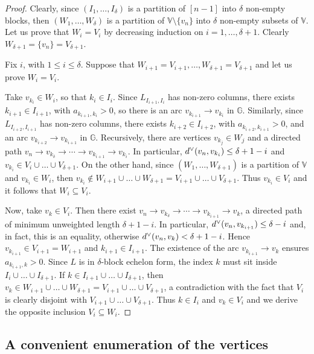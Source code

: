 \documentclass[10pt]{amsart}
\newcommand{\mbg}{\mbox{$\mathbb{G}$}}
\newcommand{\mbv}{\mbox{$\mathbb{V}$}}
\newcommand{\ud}{\mbox{${\rm d}^\vee$}}
\theoremstyle{definition}
\theoremstyle{remark}
\begin{document}
\begin{proof}
Clearly, since $(I_1,\ldots, I_\delta)$ is a partition of $[n-1]$ into
$\delta$ non-empty blocks, then $(W_1,\ldots ,W_{\delta})$ is a
partition of $\mbv\setminus\{v_n\}$ into $\delta$ non-empty subsets of
$\mbv$. Let us prove that $W_i=V_i$ by decreasing induction on
$i=1,\ldots ,\delta+1$. Clearly $W_{\delta+1}=\{v_n\}=V_{\delta+1}$.

Fix $i$, with $1\leq i\leq\delta$. Suppose that
$W_{i+1}=V_{i+1},\ldots ,W_{\delta+1}=V_{\delta+1}$ and let us prove
$W_i=V_i$.

Take $v_{k_i}\in W_i$, so that $k_i\in I_i$.  Since
$L_{I_{i+1},I_{i}}$ has non-zero columns, there exists $k_{i+1}\in
I_{i+1}$, with $a_{k_{i+1},k_i}>0$, so there is an arc $v_{k_{i+1}}\to
v_{k_i}$ in $\mbg$. Similarly, since $L_{I_{i+2},I_{i+1}}$ has
non-zero columns, there exists $k_{i+2}\in I_{i+2}$, with
$a_{k_{i+2},k_{i+1}}>0$, and an arc $v_{k_{i+2}}\to v_{k_{i+1}}$ in
$\mbg$. Recursively, there are vertices $v_{k_j}\in W_{j}$ and a
directed path $v_n\to v_{k_{\delta}}\to\cdots \to v_{k_{i+1}}\to
v_{k_i}$. In particular, $\ud(v_n,v_{k_i})\leq \delta+1-i$ and
$v_{k_i}\in V_{i}\cup\ldots \cup V_{\delta+1}$. On the other hand, since
$(W_1,\ldots ,W_{\delta+1})$ is a partition of $\mbv$ and $v_{k_i}\in
W_i$, then $v_{k_i}\not\in W_{i+1}\cup\ldots \cup
W_{\delta+1}=V_{i+1}\cup\ldots\cup V_{\delta+1}$. Thus $v_{k_i}\in
V_i$ and it follows that $W_i\subseteq V_i$.

Now, take $v_{k}\in V_i$. Then there exist $v_n\to
v_{k_\delta}\to\cdots \to v_{k_{i+1}}\to v_k$, a directed path of
minimum unweighted length $\delta+1-i$. In particular,
$\ud(v_n,v_{k_{i+1}})\leq \delta-i$ and, in fact, this is an equality,
otherwise $\ud(v_n,v_k)<\delta+1-i$. Hence $v_{k_{i+1}}\in
V_{i+1}=W_{i+1}$ and $k_{i+1}\in I_{i+1}$. The existence of the arc
$v_{k_{i+1}}\to v_k$ ensures $a_{k_{i+1},k}>0$. Since $L$ is in
$\delta$-block echelon form, the index $k$ must sit inside
$I_i\cup\ldots \cup I_{\delta +1}$. If $k\in I_{i+1}\cup\ldots \cup
I_{\delta+1}$, then $v_k\in W_{i+1}\cup\ldots \cup
W_{\delta+1}=V_{i+1}\cup\ldots\cup V_{\delta+1}$, a contradiction with
the fact that $V_i$ is clearly disjoint with $V_{i+1}\cup\ldots\cup
V_{\delta+1}$.  Thus $k\in I_{i}$ and $v_k\in V_i$ and we derive the
opposite inclusion $V_i\subseteq W_i$.
\end{proof}

\subsection{A convenient enumeration of the vertices} 
\end{document}
